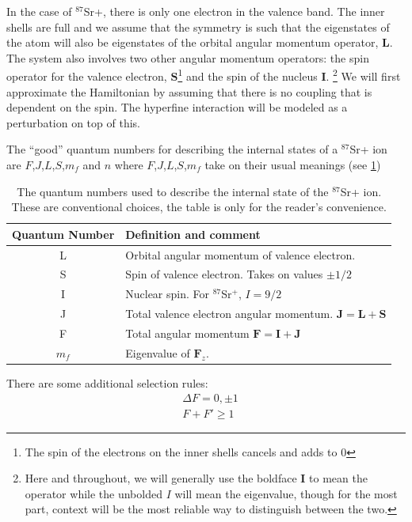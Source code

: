 In the case of $^{87}$Sr+, there is only one electron in the valence band. The inner shells are full and we assume that the symmetry is such that the eigenstates of the atom will also be eigenstates of the orbital angular momentum operator, $\mathbf{L}$.
 The system also involves two other angular momentum operators: the spin operator for the valence electron, $\mathbf{S}$\footnote{The spin of the electrons on the inner shells cancels and adds to 0} and the spin of the nucleus $\mathbf{I}$.
\footnote{Here and throughout, we will generally use the boldface $\mathbf{I}$ to mean the operator while the unbolded $I$ will mean the eigenvalue, though for the most part, context will be the most reliable way to distinguish between the two.}
We will first approximate the Hamiltonian by assuming that there is no coupling that is dependent on the spin. 
The hyperfine interaction will be modeled as a perturbation on top of this.

The ``good'' quantum numbers for describing the internal states of a $^{87}$Sr+ ion are $F$,$J$,$L$,$S$,$m_f$ and $n$\cite{experimental_hyperfine_alkali_arimondo}\cite{cuaMITnotes} where $F$,$J$,$L$,$S$,$m_f$ take on their usual meanings (see \ref{quantumNumberQuickref})

\begin{table}[h!]
\centering
\begin{tabular}{|c|l|}
\hline
Quantum Number & Definition and comment \\ \hline \hline
L & Orbital angular momentum of valence electron. \\ \hline
S & Spin of valence electron. Takes on values $\pm 1/2$ \\ \hline
I & Nuclear spin. For $^{87}$Sr$^+$, $I=9/2$ \\ \hline
J & Total valence electron angular momentum. $\mathbf{J}=\mathbf{L}+\mathbf{S}$ \\ \hline
F & Total angular momentum $\mathbf{F}=\mathbf{I}+\mathbf{J}$ \\ \hline
$m_f$ & Eigenvalue of $\mathbf{F}_z$.\\ \hline
\end{tabular}
\caption{The quantum numbers used to describe the internal state of the $^{87}$Sr+ ion. These are conventional choices, the table is only for the reader's convenience.}
\label{quantumNumberQuickref}
\end{table}

There are some additional selection rules\cite{sobelman_spectra}:
\begin{align}
&\Delta F=0,\pm 1\\
&F+F'\geq 1
\label{FselectionRules}
\end{align}

